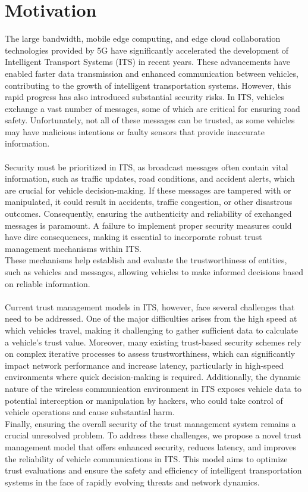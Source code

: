 \documentclass[11pt]{IEEEphot}
\begin{document}
\section{Motivation}
\vspace{10pt}
The large bandwidth, mobile edge computing, and edge cloud collaboration technologies provided by 5G have significantly accelerated the development of Intelligent Transport Systems (ITS) in recent years. These advancements have enabled faster data transmission and enhanced communication between vehicles, contributing to the growth of intelligent transportation systems. However, this rapid progress has also introduced substantial security risks. In ITS, vehicles exchange a vast number of messages, some of which are critical for ensuring road safety. Unfortunately, not all of these messages can be trusted, as some vehicles may have malicious intentions or faulty sensors that provide inaccurate information.
\\
\\
Security must be prioritized in ITS, as broadcast messages often contain vital information, such as traffic updates, road conditions, and accident alerts, which are crucial for vehicle decision-making. If these messages are tampered with or manipulated, it could result in accidents, traffic congestion, or other disastrous outcomes. Consequently, ensuring the authenticity and reliability of exchanged messages is paramount. A failure to implement proper security measures could have dire consequences, making it essential to incorporate robust trust management mechanisms within ITS.
\\
These mechanisms help establish and evaluate the trustworthiness of entities, such as vehicles and messages, allowing vehicles to make informed decisions based on reliable information.
\\
\\
Current trust management models in ITS, however, face several challenges that need to be addressed. One of the major difficulties arises from the high speed at which vehicles travel, making it challenging to gather sufficient data to calculate a vehicle’s trust value. Moreover, many existing trust-based security schemes rely on complex iterative processes to assess trustworthiness, which can significantly impact network performance and increase latency, particularly in high-speed environments where quick decision-making is required. Additionally, the dynamic nature of the wireless communication environment in ITS exposes vehicle data to potential interception or manipulation by hackers, who could take control of vehicle operations and cause substantial harm.
\\
Finally, ensuring the overall security of the trust management system remains a crucial unresolved problem. To address these challenges, we propose a novel trust management model that offers enhanced security, reduces latency, and improves the reliability of vehicle communications in ITS. This model aims to optimize trust evaluations and ensure the safety and efficiency of intelligent transportation systems in the face of rapidly evolving threats and network dynamics.
\end{document}
